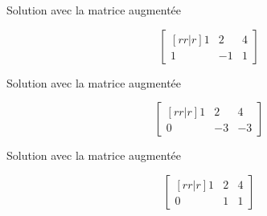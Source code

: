 \documentclass[french]{beamer}
\begin{document}
\begin{frame}{Solution avec la matrice augmentée}
\begin{example}
\[
   \begin{bmatrix}[rr|r]
   1 & 2 & 4\\
   1 & -1 & 1
   \end{bmatrix}
\]
\end{example}
\end{frame}

\begin{frame}{Solution avec la matrice augmentée}
\begin{example}
\[
   \begin{bmatrix}[rr|r]
   1 & 2 & 4\\
   0 & -3 & -3
   \end{bmatrix} 
\]
\end{example}
\end{frame}


\begin{frame}{Solution avec la matrice augmentée}
\begin{example}
\[
   \begin{bmatrix}[rr|r]
   1 & 2 & 4\\
   0 & 1 & 1
   \end{bmatrix} 
\]
   
\end{example}
\end{frame}
\end{document}
